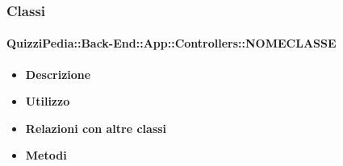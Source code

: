 \subsubsection{Classi}
\paragraph{QuizziPedia::Back-End::App::Controllers::NOMECLASSE}
\begin{itemize}
	\item \textbf{Descrizione} \\
	\item \textbf{Utilizzo} \\
	\item \textbf{Relazioni con altre classi} \\
	\item \textbf{Metodi} \\
\end{itemize}